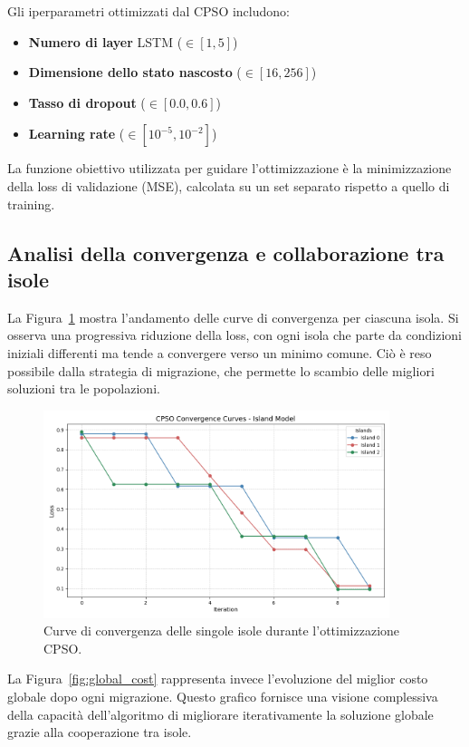 \documentclass{article}
\begin{document}
Gli iperparametri ottimizzati dal CPSO includono:
\begin{itemize}
    \item \textbf{Numero di layer} LSTM ($\in [1, 5]$)
    \item \textbf{Dimensione dello stato nascosto} ($\in [16, 256]$)
    \item \textbf{Tasso di dropout} ($\in [0.0, 0.6]$)
    \item \textbf{Learning rate} ($\in [10^{-5}, 10^{-2}]$)
\end{itemize}

La funzione obiettivo utilizzata per guidare l’ottimizzazione è la minimizzazione della loss di validazione 
(MSE), calcolata su un set separato rispetto a quello di training.

\subsection*{Analisi della convergenza e collaborazione tra isole}

La Figura~\ref{fig:convergenza_isole} mostra l'andamento delle curve di convergenza per ciascuna isola. 
Si osserva una progressiva riduzione della loss, con ogni isola che parte da condizioni iniziali differenti 
ma tende a convergere verso un minimo comune. Ciò è reso possibile dalla strategia di migrazione, che 
permette lo scambio delle migliori soluzioni tra le popolazioni.

\begin{figure}[H]
    \centering
    \includegraphics[width=0.9\textwidth]{img/CPSO Convergence Curves - Island Mode.png}
    \caption{Curve di convergenza delle singole isole durante l’ottimizzazione CPSO.}
    \label{fig:convergenza_isole}
\end{figure}

La Figura~\ref{fig:global_cost} rappresenta invece l’evoluzione del miglior costo globale dopo ogni migrazione. 
Questo grafico fornisce una visione complessiva della capacità dell’algoritmo di migliorare iterativamente la 
soluzione globale grazie alla cooperazione tra isole.
\end{document}
